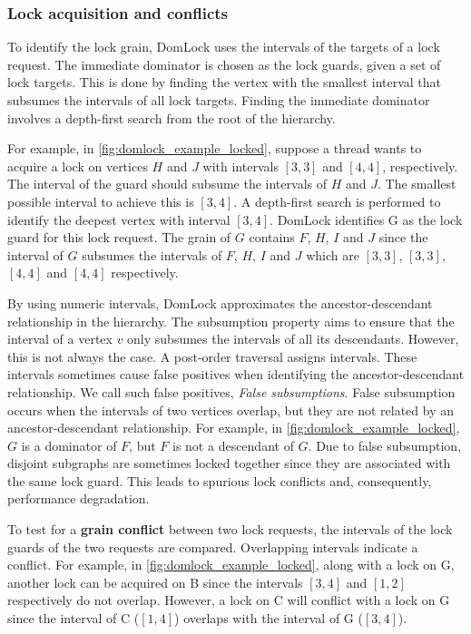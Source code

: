 \subsubsection{Lock acquisition and conflicts}

To identify the lock grain, DomLock uses the intervals of the targets of a lock request. The immediate dominator is chosen as the lock guards, given a set of lock targets. This is done by finding the vertex with the smallest interval that subsumes the intervals of all lock targets.
Finding the immediate dominator involves a depth-first search from the root of the hierarchy.  

For example, in \cref{fig:domlock_example_locked}, suppose a thread wants to acquire a lock on vertices $H$ and $J$ with intervals $[3,3]$ and $[4,4]$, respectively. The interval of the guard should subsume the intervals of $H$ and $J$. The smallest possible interval to achieve this is $[3,4]$. A depth-first search is performed to identify the deepest vertex with interval $[3,4]$. DomLock identifies G as the lock guard for this lock request. The grain of $G$ contains $F$, $H$, $I$ and $J$ since the interval of $G$ subsumes the intervals of $F$, $H$, $I$ and $J$ which are $[3,3]$, $[3,3]$, $[4,4]$ and $[4,4]$ respectively.

By using numeric intervals, DomLock approximates the ancestor-descendant relationship in the hierarchy. The subsumption property aims to ensure that the interval of a vertex $v$ only subsumes the intervals of all its descendants. However, this is not always the case. 
A post-order traversal assigns intervals. These intervals sometimes cause false positives when identifying the ancestor-descendant relationship. We call such false positives, \emph{False subsumptions}. 
False subsumption occurs when the intervals of two vertices overlap, but they are not related by an ancestor-descendant relationship. 
For example, in \cref{fig:domlock_example_locked}, $G$ is a dominator of $F$, but $F$ is not a descendant of $G$. 
Due to false subsumption, disjoint subgraphs are sometimes locked together since they are associated with the same lock guard. 
This leads to spurious lock conflicts and, consequently, performance degradation. 

To test for a \textbf{grain conflict} between two lock requests, the intervals of the lock guards of the two requests are compared. Overlapping intervals indicate a conflict. For example, in \cref{fig:domlock_example_locked}, along with a lock on G, another lock can be acquired on B since the intervals $[3,4]$ and $[1,2]$ respectively do not overlap. However, a lock on C will conflict with a lock on G since the interval of C ($[1,4]$) overlaps with the interval of G ($[3,4]$).

